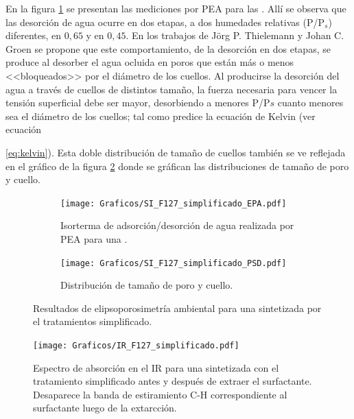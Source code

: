 		En la figura \ref{fig:F127_simplificado_EPA} se presentan las mediciones por PEA para las \pdmF. Allí se observa que las desorción de agua ocurre en dos etapas, a dos humedades relativas (P/P$_s$) diferentes, en $0,65$ y en $0,45$. En los trabajos de Jörg P. Thielemann \cite{Thielemann2011} y Johan C. Groen\cite{Groen2003} se propone que este comportamiento, de la desorción en dos etapas, se produce al desorber el agua ocluida en poros que están más o menos <<bloqueados>> por el diámetro de los cuellos. Al producirse la desorción del agua a través de cuellos de distintos tamaño, la fuerza  necesaria para vencer la tensión superficial debe ser mayor, desorbiendo a menores P/P$s$ cuanto menores sea el diámetro de los cuellos; tal como predice la ecuación de Kelvin (ver ecuación {\ref{eq:kelvin}). Esta doble distribución de tamaño de cuellos también se ve reflejada en el gráfico de la figura \ref{fig:F127_simplificado_PSD} donde se gráfican las distribuciones de tamaño de poro y cuello.

			\begin{figure}[th]
			  	\begin{subfigure}[t]{0.495\textwidth}
			  	\texttt{[image: Graficos/SI\_F127\_simplificado\_EPA.pdf]}
				\caption{Isorterma de adsorción/desorción de agua realizada por PEA para una \pdmF.}
				\label{fig:F127_simplificado_EPA}
				\end{subfigure}
				\begin{subfigure}[t]{0.495\textwidth}
			  	\texttt{[image: Graficos/SI\_F127\_simplificado\_PSD.pdf]}
				\caption{Distribución de tamaño de poro y cuello.\\ }
				\label{fig:F127_simplificado_PSD}
				\end{subfigure}
				\caption[Elipsoporosimetría \pdmF\space tratamiento simplificado.]{Resultados de elipsoporosimetría ambiental para una \pdmF\space sintetizada por el tratamientos simplificado.}
				\label{fig:F127_simplificado}
				\end{figure}

			\begin{figure}[ht]
				\begin{center}
				\texttt{[image: Graficos/IR\_F127\_simplificado.pdf]}
				\caption[FTIR \pdmF\space tratamiento simplificado.]{Espectro de absorción en el IR para una \pdmF\space sintetizada con el tratamiento simplificado antes y después de extraer el surfactante. Desaparece la banda de estiramiento C-H correspondiente al surfactante luego de la extarcción.}
				\label{fig:IR_F127_simplificado}
				\end{center}
				\end{figure}

}
